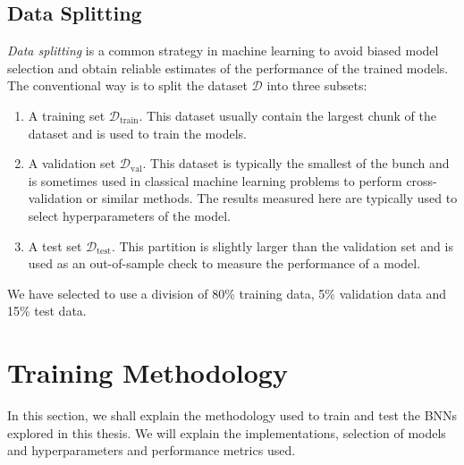 \subsection{Data Splitting}
\textit{Data splitting} is a common strategy in machine learning to avoid biased model selection and obtain reliable estimates of the performance of the trained models.
The conventional way is to split the dataset $\mathcal{D}$ into three subsets: 
\begin{enumerate}
    \item A training set $\mathcal{D}_\text{train}$. This dataset usually contain the largest chunk of the dataset and is used to train the models.
    \item A validation set $\mathcal{D}_\text{val}$. This dataset is typically the smallest of the bunch and is sometimes used in classical machine learning problems to perform cross-validation or similar methods. The results measured here are typically used to select hyperparameters of the model.
    \item A test set $\mathcal{D}_\text{test}$. This partition is slightly larger than the validation set and is used as an out-of-sample check to measure the performance of a model. 
\end{enumerate}
We have selected to use a division of 80\% training data, 5\% validation data and 15\% test data. 

\section{Training Methodology}
In this section, we shall explain the methodology used to train and test the BNNs explored in this thesis. We will explain the implementations, selection of models and hyperparameters and performance metrics used.

